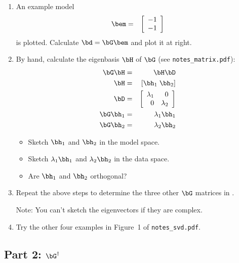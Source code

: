 \documentclass[11pt,titlepage,fleqn]{article}
\newcommand{\nfile}{{\tt notes\_svd.pdf}}
\begin{document}
\begin{enumerate}
\item An example model
%
\begin{eqnarray}
\bem  &=& \left[ \begin{array}{c} -1 \\ -1 \end{array} \right]
\end{eqnarray}
%
is plotted. Calculate $\bd = \bG\bem$ and plot it at right.

\item By hand, calculate the eigenbasis $\bH$ of $\bG$ (see \verb+notes_matrix.pdf+):
%
\begin{eqnarray}
\bG\bH  &=& \bH \bD
\\
\bH &=& [\bh_1\;\bh_2]
\\
\bD &=& \left[ \begin{array}{rr}
     \lambda_1  &  0  \\
     0  &  \lambda_2  \\
\end{array} \right]
\\
\bG\bh_1 &=& \lambda_1\bh_1
\\
\bG\bh_2 &=& \lambda_2\bh_2
\end{eqnarray}
%
\begin{itemize}
\item Sketch $\bh_1$ and $\bh_2$ in the model space.
\item Sketch $\lambda_1\bh_1$ and $\lambda_2\bh_2$ in the data space.
\item Are $\bh_1$ and $\bh_2$ orthogonal?
\end{itemize}

\item Repeat the above steps to determine the three other $\bG$ matrices in .

Note: You can't sketch the eigenvectors if they are complex.

\item Try the other four examples in Figure~1 of \nfile.

\end{enumerate}



\subsection*{Part 2: $\bG^{\dagger}$}
\end{document}
